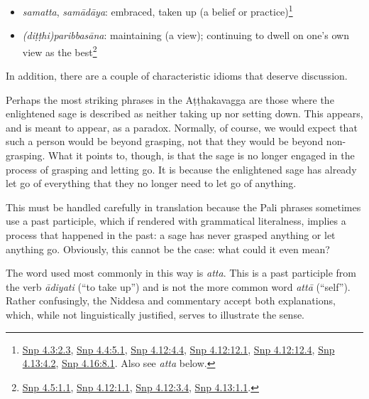 \documentclass[12pt,openany]{book}%
\begin{document}
\begin{itemize}
\item \textit{samatta}, \textit{\textsanskrit{samādāya}}: embraced, taken up (a belief or practice)\footnote{\href{https://suttacentral.net/snp4.3/en/sujato\#2.3}{Snp 4.3:2.3}, \href{https://suttacentral.net/snp4.4/en/sujato\#5.1}{Snp 4.4:5.1}, \href{https://suttacentral.net/snp4.12/en/sujato\#4.4}{Snp 4.12:4.4}, \href{https://suttacentral.net/snp4.12/en/sujato\#12.1}{Snp 4.12:12.1}, \href{https://suttacentral.net/snp4.12/en/sujato\#12.4}{Snp 4.12:12.4}, \href{https://suttacentral.net/snp4.13/en/sujato\#4.2}{Snp 4.13:4.2}, \href{https://suttacentral.net/snp4.16/en/sujato\#8.1}{Snp 4.16:8.1}. Also see \textit{atta} below. }%
\item \textit{(\textsanskrit{diṭṭhi})\textsanskrit{paribbasāna}}: maintaining (a view); continuing to dwell on one’s own view as the best\footnote{\href{https://suttacentral.net/snp4.5/en/sujato\#1.1}{Snp 4.5:1.1}, \href{https://suttacentral.net/snp4.12/en/sujato\#1.1}{Snp 4.12:1.1}, \href{https://suttacentral.net/snp4.12/en/sujato\#3.4}{Snp 4.12:3.4}, \href{https://suttacentral.net/snp4.13/en/sujato\#1.1}{Snp 4.13:1.1}. }%
\end{itemize}

In addition, there are a couple of characteristic idioms that deserve discussion.

Perhaps the most striking phrases in the \textsanskrit{Aṭṭhakavagga} are those where the enlightened sage is described as neither taking up nor setting down. This appears, and is meant to appear, as a paradox. Normally, of course, we would expect that such a person would be beyond grasping, not that they would be beyond non-grasping. What it points to, though, is that the sage is no longer engaged in the process of grasping and letting go. It is because the enlightened sage has already let go of everything that they no longer need to let go of anything.

This must be handled carefully in translation because the Pali phrases sometimes use a past participle, which if rendered with grammatical literalness, implies a process that happened in the past: a sage has never grasped anything or let anything go. Obviously, this cannot be the case: what could it even mean?

The word used most commonly in this way is \textit{atta}. This is a past participle from the verb \textit{\textsanskrit{ādiyati}} (“to take up”) and is not the more common word \textit{\textsanskrit{attā}} (“self”). Rather confusingly, the Niddesa and commentary accept both explanations, which, while not linguistically justified, serves to illustrate the sense.
\end{document}
